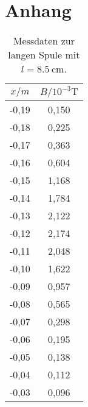 \section{Anhang}
\label{sec:Anhang}

\begin{table}[htbp]
	\centering
	\caption{Messdaten zur langen Spule mit $l = \SI{8,5}{\cm}$.}
	\label{tab:KurzeSpule}
	\begin{tabular}{c c}
		\toprule
		$x / \si{m} $ & $ B / 10^{-3} \si{\tesla}$ \\
		\midrule
		-0,19 & 0,150 \\
		-0,18 & 0,225 \\
		-0,17 & 0,363 \\
		-0,16 & 0,604 \\
		-0,15 & 1,168 \\
		-0,14 & 1,784 \\
		-0,13 & 2,122 \\
		-0,12 & 2,174 \\
		-0,11 & 2,048 \\
		-0,10 & 1,622 \\
		-0,09 & 0,957 \\
		-0,08 & 0,565 \\
		-0,07 & 0,298 \\
		-0,06 & 0,195 \\
		-0,05 & 0,138 \\
		-0,04 & 0,112 \\
		-0,03 & 0,096 \\
		\bottomrule
	\end{tabular}
\end{table}

